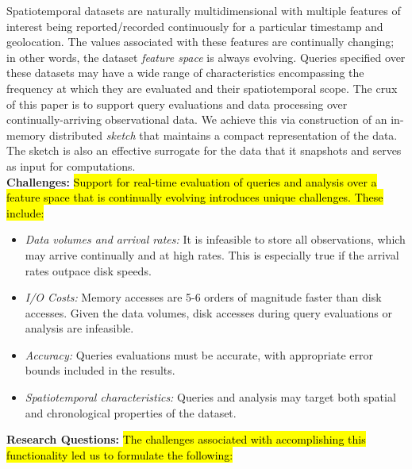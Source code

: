 \documentclass[9pt,journal,compsoc]{IEEEtran}
\begin{document}
Spatiotemporal datasets are naturally multidimensional with multiple features of interest being reported/recorded continuously for a particular timestamp and geolocation. The values associated with these features are continually changing; in other words, the dataset \emph{feature space} is always evolving.  Queries specified over these datasets may have a wide range of characteristics encompassing the frequency at which they are evaluated and their spatiotemporal scope. The crux of this paper is to support query evaluations and data processing over continually-arriving observational data. We achieve this via construction of an in-memory distributed \emph{sketch} that maintains a compact representation of the data.
The sketch is also an effective surrogate for the data that it snapshots and serves as input for computations.
%
%
\vspace{1.7em}\\
%
\textbf{Challenges:} \hl{Support for real-time evaluation of queries and analysis over a feature space that is continually evolving introduces unique challenges. These include:}
\begin{itemize}[leftmargin=*]
    \item   \emph{Data volumes and arrival rates:} It is infeasible to store all observations, which may arrive continually and at high rates. This is especially true if the arrival rates outpace disk speeds.
    \item \emph{I/O Costs:} Memory accesses are 5-6 orders of magnitude faster than disk accesses. Given the data volumes, disk accesses during query evaluations or analysis are infeasible.
    \item   \emph{Accuracy:} Queries evaluations must be accurate, with appropriate error bounds included in the results.
    \item   \emph{Spatiotemporal characteristics:} Queries and analysis may target both spatial and chronological properties of the dataset.
\end{itemize}
%
\vspace{0.7em}
%
\textbf{Research Questions:} \hl{The challenges associated with accomplishing this functionality led us to formulate the following:}
\end{document}
